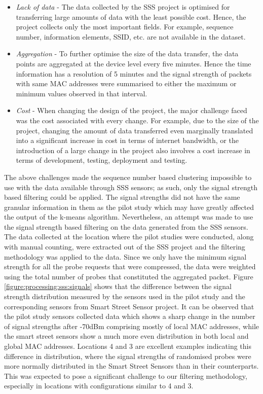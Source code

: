 \begin{itemize}
  \item \textit{Lack of data} - The data collected by the SSS project is optimised for transferring large amounts of data with the least possible cost. Hence, the project collects only the most important fields. For example, sequence number, information elements, SSID, etc. are not available in the dataset. 
  \item \textit{Aggregation} - To further optimise the size of the data transfer, the data points are aggregated at the device level every five minutes. Hence the time information has a resolution of 5 minutes and the signal strength of packets with same MAC addresses were summarised to either the maximum or minimum values observed in that interval.
  \item \textit{Cost} - When changing the design of the project, the major challenge faced was the cost associated with every change. For example, due to the size of the project, changing the amount of data transferred even marginally translated into a significant  increase in cost in terms of internet bandwidth, or the introduction of a large change in the project also involves a cost increase in terms of development, testing, deployment and testing.
\end{itemize}

The above challenges made the sequence number based clustering impossible to use with the data available through SSS sensors; as such, only the signal strength based filtering could be applied.
The signal strengths did not have the same granular information in them as the pilot study which may have greatly affected the output of the k-means algorithm.
Nevertheless, an attempt was made to use the signal strength based filtering on the data generated from the SSS sensors.
The data collected at the location where the pilot studies were conducted, along with manual counting, were extracted out of the SSS project and the filtering methodology was applied to the data.
Since we only have the minimum signal strength for all the probe requests that were compressed, the data were weighted using the total number of probes that constituted the aggregated packet.
Figure \ref{figure:processing:sss:signals} shows that the difference between the signal strength distribution measured by the sensors used in the pilot study and the corresponding sensors from Smart Street Sensor project.
It can be observed that the pilot study sensors collected data which shows a sharp change in the number of signal strengths after -70dBm comprising mostly of local MAC addresses, while the smart street sensors show a much more even distribution in both local and global MAC addresses.
Locations 4 and 3 are excellent examples indicating this difference in distribution, where the signal strengths of randomised probes were more normally distributed in the Smart Street Sensors than in their counterparts.
This was expected to pose a significant challenge to our filtering methodology, especially in locations with configurations similar to 4 and 3.

